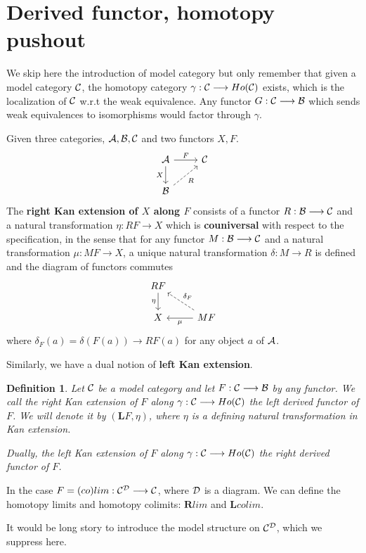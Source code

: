 \documentclass[11pt]{article}
\newtheorem{dfn}[thm]{Definition}
\newcommand{\cala}{{\cal A}}
\newcommand{\calb}{{\cal B}}
\newcommand{\calc}{{\cal C}}
\newcommand{\cald}{{\cal D}}
\newcommand{\lrta}{\longrightarrow}
\begin{document}
\section{Derived functor, homotopy pushout}
We skip here the introduction of model category but only remember that given a model category $\calc$, the homotopy category $\gamma:\calc\lrta Ho(\calc)$ exists, which is the localization of $\calc$ w.r.t the weak equivalence. Any functor $G:\calc\lrta \calb$ which sends weak equivalences to isomorphisms would factor through $\gamma$.

Given three categories, $\cala,\calb,\calc$ and two functors $X,F$. 
$$
\begin{tikzcd}
\cala \arrow[d, "X"'] \arrow[r, "F"] & \calc \\
\calb \arrow[ru, "R"', dashed] & 
\end{tikzcd}
$$
The \textbf{right Kan extension of $X$ along $F$} consists of a functor $R:\calb\lrta \calc$ and a natural transformation $\eta:RF\lrta X$ which is \textbf{couniversal} with respect to the specification, in the sense that for any functor $M:\calb\lrta \calc$ and a natural transformation $\mu: MF\lrta X$, a unique natural transformation $\delta: M\lrta R$ is defined and the diagram of functors commutes
$$
\begin{tikzcd}
RF \arrow[d, "\eta"'] &  \\
X & MF \arrow[l, "\mu"] \arrow[lu, "\delta_F"', dashed]
\end{tikzcd}
$$
where $\delta_F(a)=\delta(F(a))\lrta RF(a)$ for any object $a$ of $\cala$.

Similarly, we have a dual notion of \textbf{left Kan extension}.


\begin{dfn}
Let $\calc$ be a model category and let $F:\calc\lrta \calb$ by any functor. We call the right Kan extension of $F$ along $\gamma:\calc\lrta Ho(\calc)$ the left derived functor of $F$. We will denote it by $(\mathbf{L}F,\eta)$, where $\eta$ is a defining natural transformation in Kan extension.

Dually, the left Kan extension of $F$ along $\gamma:\calc\lrta Ho(\calc)$ the right derived functor of $F$. 
\end{dfn}

In the case $F=(co)lim:\calc^\cald\lrta \calc$, where $\cald$ is a diagram. We can define the homotopy limits and homotopy colimits:
$\mathbf{R}lim$ and $\mathbf{L}colim$.

It would be long story to introduce the model structure on $\calc^{\cald}$, which we suppress here.
\end{document}
